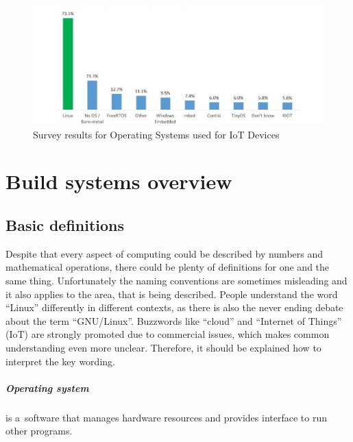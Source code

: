 \documentclass[printmode]{mgr}
\begin{document}
\begin{figure}[htbp]
  \centering
    \includegraphics[width=\textwidth]{iot-os.jpg}
    \caption{Survey results for Operating Systems used for IoT Devices \cite{web:iot-os}}
  \label{fig:iot-os}
\end{figure}



















\chapter{Build systems overview}

\section{Basic definitions}

Despite that every aspect of computing could be described by numbers and mathematical operations, there could be plenty of definitions for one and the same thing.
Unfortunately the naming conventions are sometimes misleading and it also applies to the area, that is being described.
People understand the word ``Linux'' differently in different contexts, as there is also the never ending debate about the term ``GNU/Linux''.\cite{web:gnu-linux}
Buzzwords like ``cloud'' and ``Internet of Things'' (IoT) are strongly promoted due to commercial issues, which makes common understanding even more unclear.
Therefore, it should be explained how to interpret the key wording.

\paragraph{Operating system} is a~software that manages hardware resources and provides interface to run other programs.\cite{web:def-os}
\end{document}
